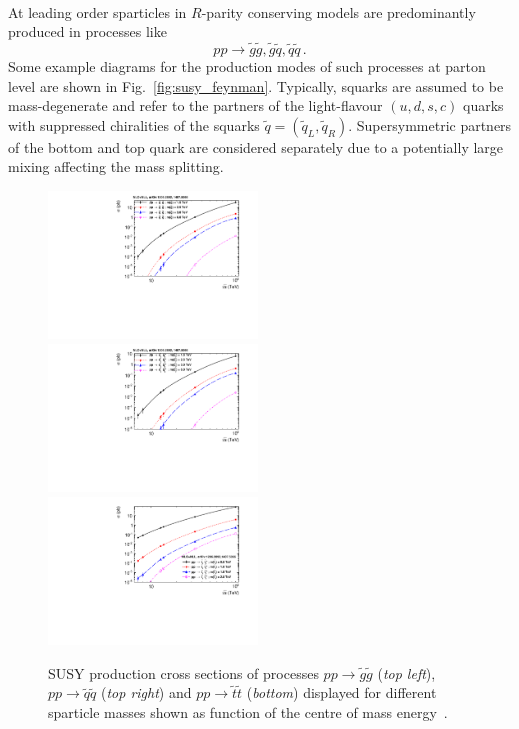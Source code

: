 \\
At leading order sparticles in $R$-parity conserving models are predominantly produced in processes like~\cite{Kane:1982hw, Harrison:1982yi, Reya:1984yz, Dawson:1983fw, Baer:1985xz}
\begin{equation}
 pp \rightarrow \tilde{g}\tilde{g}, \tilde{g}\tilde{q}, \tilde{q}\tilde{q} \, .
\end{equation}
Some example diagrams for the production modes of such processes at parton level are shown in Fig.~\ref{fig:susy_feynman}. Typically, squarks are assumed to be mass-degenerate and refer to the partners of the light-flavour $(u, d, s, c)$ quarks with suppressed chiralities of the squarks $\tilde{q} = (\tilde{q}_L, \tilde{q}_R)$. Supersymmetric partners of the bottom and top quark are considered separately due to a potentially large mixing affecting the mass splitting.
\begin{figure}[!t]
  \centering
  \begin{minipage}[c]{1.\textwidth}
    \begin{center}
      \includegraphics[width=0.495\textwidth]{figures/gluino_xsec.pdf}  
      \includegraphics[width=0.495\textwidth]{figures/squark_xsec.pdf} \\
      \includegraphics[width=0.495\textwidth]{figures/stop_xsec.pdf}
    \end{center}
  \end{minipage}
  \caption{SUSY production cross sections of processes $pp \rightarrow \tilde{g}\tilde{g}$ (\textit{top left}), $pp \rightarrow \tilde{q}\tilde{q}$ (\textit{top right}) and $pp \rightarrow \tilde{t}\tilde{t}$ (\textit{bottom}) displayed for different sparticle masses shown as function of the centre of mass energy~\cite{Kramer:2012bx, Borschensky:2014cia}.}
  \label{fig:susy_cross_sec}
\end{figure}

